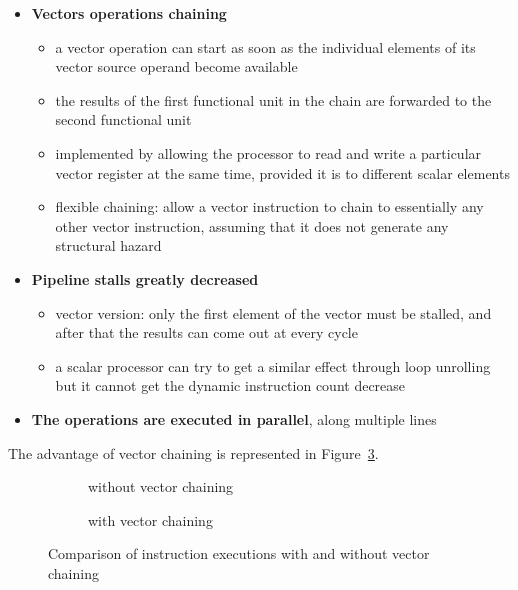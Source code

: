 \documentclass[english]{article}
\begin{document}
\begin{itemize}
  \item \textbf{Vectors operations chaining}
        \begin{itemize}
          \item a vector operation can start as soon as the individual elements of its vector source operand become available
          \item the results of the first functional unit in the chain are forwarded to the second functional unit
          \item implemented by allowing the processor to read and write a particular vector register at the same time, provided it is to different scalar elements
          \item flexible chaining: allow a vector instruction to chain to essentially any other vector instruction, assuming that it does not generate any structural hazard
        \end{itemize}
  \item \textbf{Pipeline stalls greatly decreased}
        \begin{itemize}
          \item vector version: only the first element of the vector must be stalled, and after that the results can come out at every cycle
          \item a scalar processor can try to get a similar effect through loop unrolling but it cannot get the dynamic instruction count decrease
        \end{itemize}
  \item \textbf{The operations are executed in parallel}, along multiple lines
\end{itemize}

\bigskip
The advantage of vector chaining is represented in Figure~\ref{fig:vector-chaining}.

\begin{figure}[htbp]
  \bigskip
  \centering
  \begin{subfigure}[b]{0.495\textwidth}
    \centering
    \caption{without vector chaining}
    \label{subfig:wihtout-vector-chaining}
  \end{subfigure}
  \begin{subfigure}[b]{0.495\textwidth}
    \centering
    \caption{with vector chaining}
    \label{subfig:with-vector-chaining}
  \end{subfigure}
  \caption{Comparison of instruction executions with and without vector chaining}
  \label{fig:vector-chaining}
  \bigskip
\end{figure}
\end{document}

